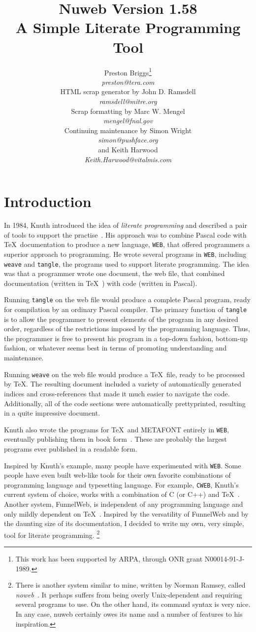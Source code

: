 \documentclass[a4paper]{report}
\title{Nuweb Version 1.58 \\ A Simple Literate Programming Tool}
\date{}
\author{Preston Briggs\thanks{This work has been supported by ARPA,
through ONR grant N00014-91-J-1989.}
\\ {\sl preston@tera.com}
\\ HTML scrap generator by John D. Ramsdell
\\ {\sl ramsdell@mitre.org}
\\ Scrap formatting by Marc W. Mengel
\\ {\sl mengel@fnal.gov}
\\ Continuing maintenance by Simon Wright
\\ {\sl simon@pushface.org}
\\ and Keith Harwood
\\ {\sl Keith.Harwood@vitalmis.com}}
\begin{document}
\maketitle
\tableofcontents

\chapter{Introduction}

In 1984, Knuth introduced the idea of {\em literate programming\/} and
described a pair of tools to support the practise~\cite{Knuth:CJ-27-2-97}.
His approach was to combine Pascal code with \TeX\ documentation to
produce a new language, \verb|WEB|, that offered programmers a superior
approach to programming. He wrote several programs in \verb|WEB|,
including \verb|weave| and \verb|tangle|, the programs used to support
literate programming.
The idea was that a programmer wrote one document, the web file, that
combined documentation (written in \TeX~\cite{Knuth:ct-a}) with code
(written in Pascal).

Running \verb|tangle| on the web file would produce a complete
Pascal program, ready for compilation by an ordinary Pascal compiler.
The primary function of \verb|tangle| is to allow the programmer to
present elements of the program in any desired order, regardless of
the restrictions imposed by the programming language. Thus, the
programmer is free to present his program in a top-down fashion,
bottom-up fashion, or whatever seems best in terms of promoting
understanding and maintenance.

Running \verb|weave| on the web file would produce a \TeX\ file, ready
to be processed by \TeX\@. The resulting document included a variety of
automatically generated indices and cross-references that made it much
easier to navigate the code. Additionally, all of the code sections
were automatically prettyprinted, resulting in a quite impressive
document.

Knuth also wrote the programs for \TeX\ and {\small\sf METAFONT}
entirely in \verb|WEB|, eventually publishing them in book
form~\cite{Knuth:ct-b,Knuth:ct-d}. These are probably the
largest programs ever published in a readable form.

Inspired by Knuth's example, many people have experimented with
\verb|WEB|\@. Some people have even built web-like tools for their
own favorite combinations of programming language and typesetting
language. For example, \verb|CWEB|, Knuth's current system of choice,
works with a combination of C (or C++) and \TeX~\cite{Levy:TB8-1-12}.
Another system, FunnelWeb, is independent of any programming language
and only mildly dependent on \TeX~\cite{Williams:FUM92}. Inspired by the
versatility of FunnelWeb and by the daunting size of its
documentation, I decided to write my own, very simple, tool for
literate programming.%
\footnote{There is another system similar to
mine, written by Norman Ramsey, called {\em noweb}~\cite{Ramsey:LPT92}. It
perhaps suffers from being overly Unix-dependent and requiring several
programs to use. On the other hand, its command syntax is very nice.
In any case, nuweb certainly owes its name and a number of features to
his inspiration.}
\end{document}
